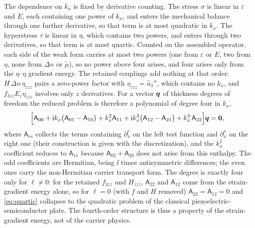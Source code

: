 The dependence on $k_x$ is fixed by derivative counting.  The stress $\sigma$ is linear in
$\varepsilon$ and $E$, each containing one power of $k_x$, and enters the
mechanical balance through one further derivative, so that term is at most quadratic
in $k_x$.  The hyperstress $\tau$ is linear in $\eta$, which contains two powers, and
enters through two derivatives, so that term is at most quartic.  Counted on the assembled
operator, each side of the weak form carries at most two powers (one from $\varepsilon$ or $E$, two
from $\eta$, none from $\Delta n$ or $\widetilde\mu$), so no power above four arises, and four arises
only from the $\eta$--$\eta$ gradient energy.  The retained couplings add nothing at that order: $H\,\Delta n\,\eta_{zzz}$ pairs a
zero-power factor with $\eta_{zzz}=\widehat u_3''$, which contains no $k_x$, and $f_{3zz}E_z\eta_{zzz}$ involves only $z$ derivatives.  For a
vector $\boldsymbol{q}$ of thickness degrees of freedom the reduced problem is therefore a
polynomial of degree four in $k_x$,
\begin{equation}
\label{eq:quartic}
\Bigl[\mathsf A_{00}
+\mathrm{i} k_x\bigl(\mathsf A_{01}-\mathsf A_{10}\bigr)
+k_x^{2}\mathsf A_{11}
+\mathrm{i} k_x^{3}\bigl(\mathsf A_{12}-\mathsf A_{21}\bigr)
+k_x^{4}\,\mathsf A_{22}\Bigr]\boldsymbol{q}=\boldsymbol{0} ,
\end{equation}
where $\mathsf A_{rs}$ collects the terms containing $\partial_x^{r}$ on the left test
function and $\partial_x^{s}$ on the right one (their construction is given with the
discretization), and the $k_x^{2}$ coefficient reduces to $\mathsf A_{11}$ because
$\mathsf A_{02}+\mathsf A_{20}$ does not arise from this enthalpy.  The odd coefficients
are Hermitian, being $\ii$ times antisymmetric differences; the even ones carry the
non-Hermitian carrier transport form.  The degree is exactly four only for $\ell\neq0$:
for the retained $f_{3zz}$ and $H_{zzz}$, $\mathsf A_{22}$ and $\mathsf A_{12}$ come from the strain-gradient energy alone, so
for $\ell=0$ (with $f$ and $H$ removed) $\mathsf A_{22}=\mathsf A_{12}=0$ and
\eqref{eq:quartic} collapses to the quadratic problem of the classical
piezoelectric-semiconductor plate.  The fourth-order structure is thus a property
of the strain-gradient energy, not of the carrier physics.

